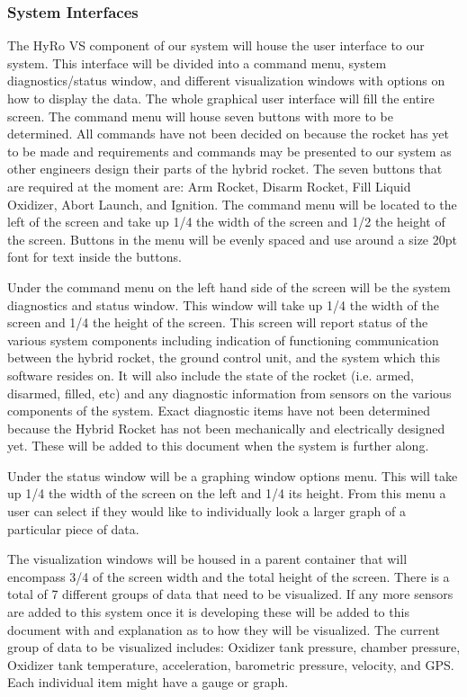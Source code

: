 \documentclass[10pt,draftclsnofoot,onecolumn,compsoc]{IEEEtran}
\begin{document}
\subsubsection{System Interfaces}
The HyRo VS component of our system will house the user interface to our system. This interface will be divided into a command menu, system diagnostics/status window, and different visualization windows with options on how to display the data. The whole graphical user interface will fill the entire screen. The command menu will house seven buttons with more to be determined. All commands have not been decided on because the rocket has yet to be made and requirements and commands may be presented to our system as other engineers design their parts of the hybrid rocket.  The seven buttons that are required at the moment are: Arm Rocket, Disarm Rocket, Fill Liquid Oxidizer, Abort Launch, and Ignition. The command menu will be located to the left of the screen and take up 1/4 the width of the screen and 1/2 the height of the screen. Buttons in the menu will be evenly spaced and use around a size 20pt font for text inside the buttons. \par
	Under the command menu on the left hand side of the screen will be the system diagnostics and status window. This window will take up 1/4 the width of the screen and 1/4 the height of the screen. This screen will report status of the various system components including indication of functioning communication between the hybrid rocket, the ground control unit, and the system which this software resides on. It will also include the state of the rocket (i.e. armed, disarmed, filled, etc) and any diagnostic information from sensors on the various components of the system. Exact diagnostic items have not been determined because the Hybrid Rocket has not been mechanically and electrically designed yet. These will be added to this document when the system is further along.\par 
	Under the status window will be a graphing window options menu. This will take up 1/4 the width of the screen on the left and 1/4 its height. From this menu a user can select if they would like to individually look a larger graph of a particular piece of data. \par
	The visualization windows will be housed in a parent container that will encompass 3/4 of the screen width and the total height of the screen. There is a total of 7 different groups of data that need to be visualized.  If any more sensors are added to this system once it is developing these will be added to this document with and explanation as to how they will be visualized.  The current group of data to be visualized includes:  Oxidizer tank pressure, chamber pressure, Oxidizer tank temperature, acceleration, barometric pressure, velocity, and GPS.   Each individual item might have a gauge or graph.\par
	
\end{document}
